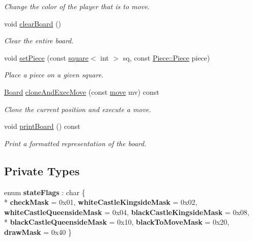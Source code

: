 \begin{DoxyCompactItemize}
\begin{DoxyCompactList}\small\item\em Change the color of the player that is to move. \end{DoxyCompactList}\item 
void \hyperlink{classBoard_a5f148daa03da25d40dff3fc613568d6f}{clear\+Board} ()\hypertarget{classBoard_a5f148daa03da25d40dff3fc613568d6f}{}\label{classBoard_a5f148daa03da25d40dff3fc613568d6f}

\begin{DoxyCompactList}\small\item\em Clear the entire board. \end{DoxyCompactList}\item 
void \hyperlink{classBoard_a2a15fa8b4b4db9d11093c6c806344fc6}{set\+Piece} (const \hyperlink{structsquare}{square}$<$ int $>$ sq, const \hyperlink{namespacePiece_a588233307aa6bdb32c1d62c9f20895cc}{Piece\+::\+Piece} piece)\hypertarget{classBoard_a2a15fa8b4b4db9d11093c6c806344fc6}{}\label{classBoard_a2a15fa8b4b4db9d11093c6c806344fc6}

\begin{DoxyCompactList}\small\item\em Place a piece on a given square. \end{DoxyCompactList}\item 
\hyperlink{classBoard}{Board} \hyperlink{classBoard_aef2523a362ab327fb628f4f226db52de}{clone\+And\+Exec\+Move} (const \hyperlink{structmove}{move} mv) const 
\begin{DoxyCompactList}\small\item\em Clone the current position and execute a move. \end{DoxyCompactList}\item 
void \hyperlink{classBoard_a58b38efec8c8ce21b55546da09685a3e}{print\+Board} () const 
\begin{DoxyCompactList}\small\item\em Print a formatted representation of the board. \end{DoxyCompactList}\end{DoxyCompactItemize}
\subsection*{Private Types}
\begin{DoxyCompactItemize}
\item 
enum {\bfseries state\+Flags} \+: char \{ \\*
{\bfseries check\+Mask} = 0x01, 
{\bfseries white\+Castle\+Kingside\+Mask} = 0x02, 
{\bfseries white\+Castle\+Queenside\+Mask} = 0x04, 
{\bfseries black\+Castle\+Kingside\+Mask} = 0x08, 
\\*
{\bfseries black\+Castle\+Queenside\+Mask} = 0x10, 
{\bfseries black\+To\+Move\+Mask} = 0x20, 
{\bfseries draw\+Mask} = 0x40
 \}\hypertarget{classBoard_a6f2173ec700556df381b6623a5482850}{}\label{classBoard_a6f2173ec700556df381b6623a5482850}

\end{DoxyCompactItemize}
